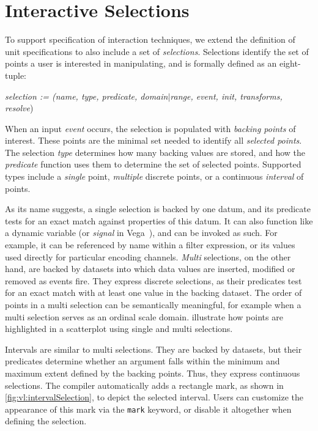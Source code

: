 
\vspace{-20pt}

\section{Interactive Selections}
\label{sec:vl:goi}

\vspace{-10pt}

To support specification of interaction techniques, we extend the definition of
unit specifications to also include a set of \emph{selections}. Selections
identify the set of points a user is interested in manipulating, and is formally
defined as an eight-tuple:

\vspace{7pt}
\centerline{
  \emph{selection := (name, type, predicate, domain$|$range, event, init,
  transforms, resolve})
}

When an input \emph{event} occurs, the selection is populated with \emph{backing
points} of interest. These points are the minimal set needed to identify all
\emph{selected points}. The selection \emph{type} determines how many backing
values are stored, and how the \emph{predicate} function uses them to determine
the set of selected points. Supported types include a \emph{single} point,
\emph{multiple} discrete points, or a continuous \emph{interval} of points.

As its name suggests, a single selection is backed by one datum, and its
predicate tests for an exact match against properties of this datum. It can also
function like a dynamic variable (or \emph{signal} in
Vega~\cite{reactive-vega-model}), and can be invoked as such. For example, it
can be referenced by name within a filter expression, or its values used
directly for particular encoding channels. \emph{Multi} selections, on the other
hand, are backed by datasets into which data values are inserted, modified or
removed as events fire. They express discrete selections, as their predicates
test for an exact match with at least one value in the backing dataset. The
order of points in a multi selection can be semantically meaningful, for example
when a multi selection serves as an ordinal scale domain.
 illustrate how points are
highlighted in a scatterplot using single and multi selections.

Intervals are similar to multi selections. They are backed by datasets, but
their predicates determine whether an argument falls within the minimum and
maximum extent defined by the backing points. Thus, they express continuous
selections. The compiler automatically adds a rectangle mark, as shown in
\cref{fig:vl:intervalSelection}, to depict the selected interval. Users can
customize the appearance of this mark via the \texttt{mark} keyword, or disable
it altogether when defining the selection.

